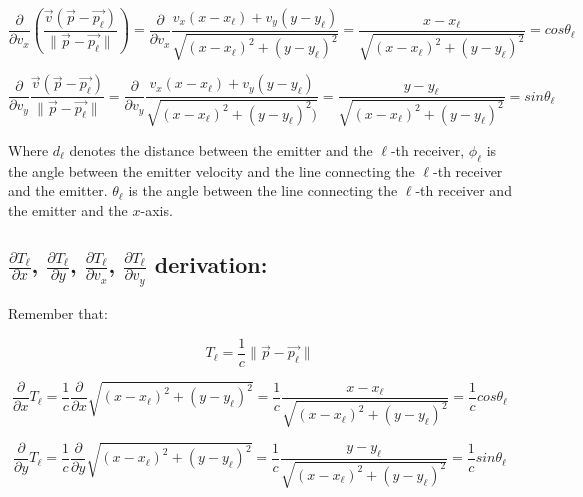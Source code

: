 \documentclass[10pt,a4paper]{report}
\begin{document}
\begin{equation}
\frac{\partial}{\partial v_x} (\frac{\vec{v}(\vec{p}-\vec{p_\ell})}{\|\vec{p}-\vec{p_\ell}\|})=\frac{\partial}{\partial v_x} \frac{v_x(x-x_\ell )+v_y(y-y_\ell)}{\sqrt{(x-x_\ell )^2+(y-y_\ell )^2}}=\frac{x-x_\ell}{\sqrt{(x-x_\ell )^2+(y-y_\ell )^2}}=cos\theta_\ell
\end{equation}

\begin{equation}
\frac{\partial}{\partial v_y} \frac{\vec{v}(\vec{p}-\vec{p_\ell})}{\|\vec{p}-\vec{p_\ell}\|}=\frac{\partial}{\partial v_y}\frac{v_x (x-x_\ell )+v_y (y-y_\ell )}{\sqrt{(x-x_\ell )^2+(y-y_\ell )^2 )}}=\frac{y-y_\ell}{\sqrt{(x-x_\ell )^2+(y-y_\ell )^2}}=sin\theta_\ell
\end{equation}

Where $d_\ell$ denotes the distance between the emitter and the $\ell$-th receiver, $\phi_\ell$ is the angle between the emitter velocity and the line connecting the $\ell$-th receiver and the emitter. $\theta_\ell$ is the angle between the line connecting the $\ell$-th receiver and the emitter and the $x$-axis.

\subsection{$\frac{\partial T_\ell}{\partial x}$, $\frac{\partial T_\ell}{\partial y}$,
$\frac{\partial T_\ell}{\partial v_x}$, $\frac{\partial T_\ell}{\partial v_y}$
 derivation:}
 
Remember that:

\begin{equation}
T_\ell=\frac{1}{c} \|\vec{p}-\vec{p_\ell}\|
\end{equation}

\begin{equation}
\frac{\partial}{\partial x} T_\ell=\frac{1}{c}  \frac{\partial}{\partial x} \sqrt{(x-x_\ell )^2+(y-y_\ell )^2}=\frac{1}{c}\frac{x-x_\ell }{\sqrt{(x-x_\ell  )^2+(y-y_\ell )^2}}=\frac{1}{c} cos\theta_\ell                                
\end{equation}

\begin{equation}
\frac{\partial} {\partial y} T_\ell =\frac{1}{c}  \frac{\partial}{\partial y} \sqrt{(x-x_\ell  )^2+(y-y_\ell  )^2}=\frac{1}{c}\frac{y-y_\ell }{\sqrt{(x-x_\ell  )^2+(y-y_\ell  )^2}}=\frac{1}{c} sin\theta_\ell                                  
\end{equation}
\end{document}
